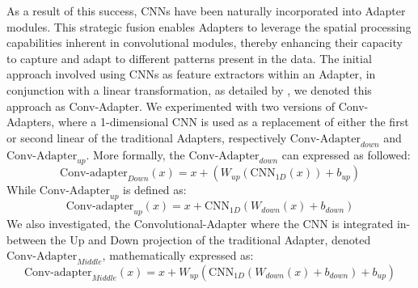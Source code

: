 As a result of this success, \acp{CNN} have been naturally incorporated into Adapter modules. This strategic fusion enables Adapters to leverage the spatial processing capabilities inherent in convolutional modules, thereby enhancing their capacity to capture and adapt to different patterns present in the data. The initial approach involved using \acp{CNN} as feature extractors within an Adapter, in conjunction with a linear transformation, as detailed by \cite{yang23p_interspeech}, we denoted this approach as Conv-Adapter. We experimented with two versions of Conv-Adapters, where a 1-dimensional \ac{CNN} is used as a replacement of either the first or second linear of the traditional Adapters, respectively \textit{$\text{Conv-Adapter}_{down}$} and \textit{$\text{Conv-Adapter}_{up}$}. More formally, the \textit{$\text{Conv-Adapter}_{down}$} can expressed as followed:
\begin{equation}
    \text{Conv-adapter}_{Down}(x) = x + (W_{up}(\text{CNN}_{1D}(x))+ b_{up})
\end{equation}
While \textit{$\text{Conv-Adapter}_{up}$} is defined as:
\begin{equation}
    \text{Conv-adapter}_{up}(x) = x + \text{CNN}_{1D}(W_{down}(x)+ b_{down})
\end{equation}
We also investigated, the \cite{muthuchamyselvaraj23_interspeech} Convolutional-Adapter where the \ac{CNN} is integrated in-between the Up and Down projection of the traditional Adapter, denoted \textit{$\text{Conv-Adapter}_{Middle}$}, mathematically expressed as:
\begin{equation}
    \text{Conv-adapter}_{Middle}(x) = x + W_{up}(\text{CNN}_{1D}(W_{down}(x)+ b_{down})+ b_{up})
\end{equation}

